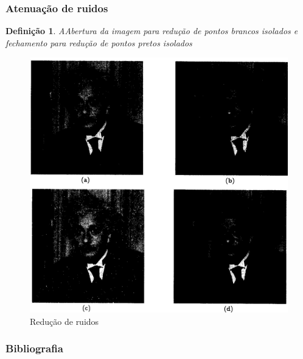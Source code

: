 \documentclass[aspectratio=169]{beamer}
\theoremstyle{Definition}
\newtheorem{defn}{Defini\c c\~ao}
\begin{document}
\begin{frame}
	\frametitle{Atenuação de ruidos}
	
	\begin{defn}
		AAbertura da imagem para redução de pontos brancos isolados e fechamento para redução de pontos pretos isolados
	\end{defn}
	
	\begin{figure}[h]
	 	\includegraphics[height=0.4\paperheight]{imagens/reducaoruidos}
		\caption{Redução de ruidos}\label{figLogical}
	\end{figure}

\end{frame}

\begin{frame}
	\frametitle{Bibliografia}
	



\end{frame}


\end{document}

